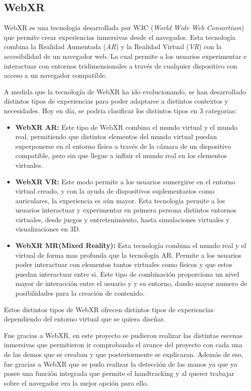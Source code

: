 \documentclass[a4paper, 12pt]{book}
\begin{document}
\subsection{WebXR}
\label{subsec:WebXR}

WebXR \cite{onirix2024} es una tecnología desarrollada por W3C (\textit{World Wide Web Consortium}) que permite crear experiencias inmersivas desde el navegador. Esta tecnología combina la Realidad Aumentada (\textit{AR}) y la Realidad Virtual (\textit{VR}) con la accesibilidad de un navegador web.
Lo cual permite a los usuarios experimentar e interactuar con entornos tridimensionales a través de cualquier dispositivo con acceso a un navegador compatible.

A medida que la tecnología de WebXR ha ido evolucionando, se han desarrollado distintos tipos de experiencias para poder adaptarse a distintos contextos y necesidades. Hoy en día, se podria clasificar los distintos tipos en 3 categorias:
\begin{itemize}
	\item \textbf{WebXR AR:} Este tipo de WebXR combina el mundo virtual y el mundo real, permitiendo que distintos elementos del mundo virtual puedan superponerse en el entorno físico a través
	      de la cámara de un dispositivo compatible, pero sin que llegue a influir el mundo real en los elementos virtuales.
	\item \textbf{WebXR VR:} Este modo permite a los usuarios sumergirse en el entorno virtual creado, y con la ayuda de dispositivos suplementarios como auriculares, la experiencia es aún mayor. Esta tecnología permite a los usuarios
	      interactuar y experimentar en primera persona distintos entornos virtuales, desde juegos y entretenimiento, hasta simulaciones virtuales y visualizaciones en 3D.
	\item \textbf{WebXR MR(Mixed Reality):} Esta tecnología combina el mundo real y el virtual de forma mas profunda que la tecnología AR. Permite a los usuarios poder interactuar con elementos tantos virtuales como físicos y que estos puedan interactuar entre si. Este tipo de combinación proporciona un nivel mayor de interacción entre el usuario y
	      y su entorno, dando mayor numero de posibilidades para la creación de contenido.
\end{itemize}

Estos distintos tipos de WebXR ofrecen distintos tipos de experiencias dependiendo del entorno virtual que se quiera diseñar.

Fue gracias a WebXR, en este proyecto se pudieron realizar las distintas escenas inmersivas que permitieron ir comprobando el avance del proyecto con cada una de las demos que se creaban y que posteriormente se explicaran. Además de eso, fue gracias a WebXR que se pudo realizar la detección de las manos ya que ya posee una función integrada que permite el handtracking y al querer trabajar sobre el navegador era la mejor opción para ello. 
\end{document}
